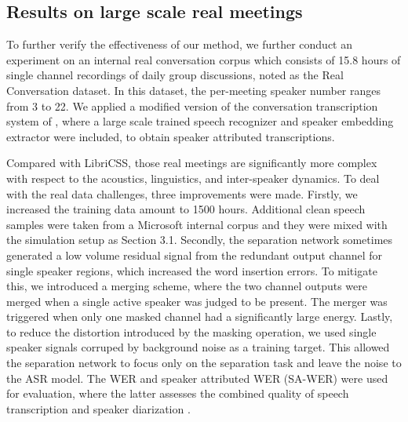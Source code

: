 \documentclass{article}
\begin{document}
	




	






	




	


	
	
	\subsection{Results on large scale real meetings}
	To further verify the effectiveness of our method, we further conduct an experiment on an internal real conversation corpus which consists of 15.8 hours of single channel recordings of daily group discussions, noted as the Real Conversation dataset. In this dataset, the per-meeting speaker number ranges from 3 to 22. We applied a modified version of the conversation transcription system of \cite{yoshioka2019advances}, where a large scale trained speech recognizer and speaker embedding extractor were included, 
to obtain  speaker attributed transcriptions.


	Compared with LibriCSS, those real meetings are significantly more complex with respect to the acoustics, linguistics, and inter-speaker dynamics. To deal with the real data challenges, 
	three improvements were made. Firstly, we increased the training data amount to 1500 hours.
	Additional clean speech samples were taken from a Microsoft internal corpus and they were mixed with the simulation setup as Section 3.1. 
	Secondly, the separation network sometimes generated a low volume residual signal from the redundant output channel for single speaker regions, which increased the word insertion errors. To mitigate this, we introduced a merging scheme, where the two channel outputs were merged when a single active speaker was judged to be present. 
The merger was triggered when only one masked channel had a significantly large energy. Lastly, to reduce the distortion introduced by the masking operation, we used single speaker signals corruped by background noise as a training target. This allowed the separation network to focus only on the separation task and leave the noise to the ASR model. 
	The WER and speaker attributed WER (SA-WER) were used for evaluation, where the latter assesses the combined quality of speech transcription and  speaker diarization \cite{yoshioka2019advances}.
	
\end{document}
